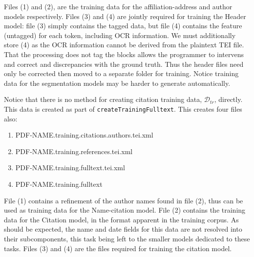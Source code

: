 \documentclass[11pt, oneside]{scrartcl}   	%
\begin{document}
Files (1) and (2), are the training data for the affiliation-address and author models respectively. Files (3) and (4) are jointly required for training the Header model: file (3) simply contains the tagged data, but file (4) contains the feature (untagged) for each token, including OCR information. We must additionally store (4) as the OCR information cannot be derived from the plaintext TEI file. That the processing does not tag the blocks allows the programmer to intervens and correct and discrepancies with the ground truth. Thus the header files need only be corrected then moved to a separate folder for training. Notice training data for the segmentation models may be harder to generate automatically.

Notice that there is no method for creating citation training data, $\mathcal{D}_{tr}$, directly. This data is created as part of \texttt{createTrainingFulltext}. This creates four files also:

\begin{enumerate}
\item PDF-NAME.training.citations.authors.tei.xml
\item PDF-NAME.training.references.tei.xml
\item PDF-NAME.training.fulltext.tei.xml
\item PDF-NAME.training.fulltext
\end{enumerate}

File (1) contains a refinement of the author names found in file (2), thus can be used as training data for the Name-citation model. File (2) contains the training data for the Citation model, in the format apparent in the training corpus. As should be expected, the name and date fields for this data are not resolved into their subcomponents, this task being left to the smaller models dedicated to these tasks. Files (3) and (4) are the files required for training the citation model.
\end{document}
